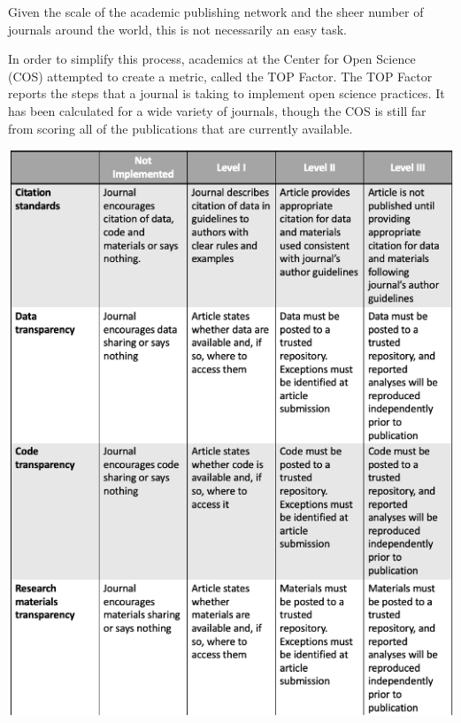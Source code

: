 \documentclass[12pt,twoside]{reedthesis}
\begin{document}
Given the scale of the academic publishing network and the sheer number of journals around the world, this is not necessarily an easy task.

In order to simplify this process, academics at the Center for Open Science (COS) attempted to create a metric, called the TOP Factor. The TOP Factor reports the steps that a journal is taking to implement open science practices. It has been calculated for a wide variety of journals, though the COS is still far from scoring all of the publications that are currently available.
\begin{center}\includegraphics[width=1\linewidth]{figure/top-1} \end{center}
\end{document}
